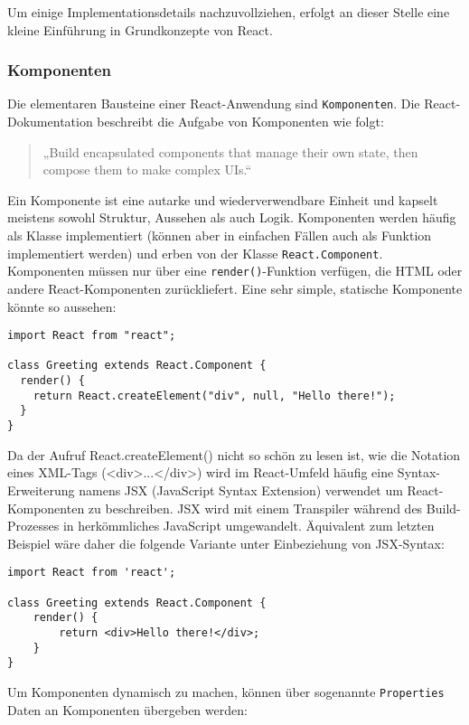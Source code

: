 Um einige Implementationsdetails nachzuvollziehen, erfolgt an dieser Stelle eine kleine Einführung in Grundkonzepte von React.

\subsubsection{Komponenten}
Die elementaren Bausteine einer React-Anwendung sind \texttt{Komponenten}. Die React-Dokumentation beschreibt die Aufgabe von Komponenten wie folgt\cite{web:react}:
\begin{quotation}
„Build encapsulated components that manage their own state, then compose them to make complex UIs.“
\end{quotation}

Ein Komponente ist eine autarke und wiederverwendbare Einheit und kapselt meistens sowohl Struktur, Aussehen als auch Logik. Komponenten werden häufig als Klasse implementiert (können aber in einfachen Fällen auch als Funktion implementiert werden) und erben von der Klasse \texttt{React.Component}. Komponenten müssen nur über eine \texttt{render()}-Funktion verfügen, die HTML oder andere React-Komponenten zurückliefert. Eine sehr simple, statische Komponente könnte so aussehen:

\begin{lstlisting}
import React from "react";

class Greeting extends React.Component {
  render() {
    return React.createElement("div", null, "Hello there!");
  }
}
\end{lstlisting}

Da der Aufruf React.createElement() nicht so schön zu lesen ist, wie die Notation eines XML-Tags (<div>...</div>) wird im React-Umfeld häufig eine Syntax-Erweiterung namens JSX (JavaScript Syntax Extension) verwendet um React-Komponenten zu beschreiben. JSX wird mit einem Transpiler während des Build-Prozesses in herkömmliches JavaScript umgewandelt. Äquivalent zum letzten Beispiel wäre daher die folgende Variante unter Einbeziehung von JSX-Syntax:

\begin{lstlisting}
import React from 'react';

class Greeting extends React.Component {
    render() {
        return <div>Hello there!</div>;
    }
}
\end{lstlisting}

Um Komponenten dynamisch zu machen, können über sogenannte \texttt{Properties} Daten an Komponenten übergeben werden:

